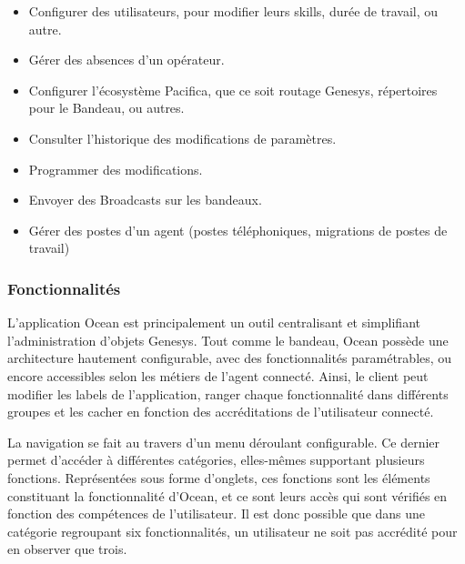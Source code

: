 \documentclass{rapport}
\begin{document}
\begin{itemize}
\item Configurer des utilisateurs, pour modifier leurs skills, durée de travail, ou autre.
\item Gérer des absences d'un opérateur.
\item Configurer l'écosystème Pacifica, que ce soit routage Genesys, répertoires pour le Bandeau, ou autres.
\item Consulter l'historique des modifications de paramètres.
\item Programmer des modifications.
\item Envoyer des Broadcasts sur les bandeaux.
\item Gérer des postes d'un agent (postes téléphoniques, migrations de postes de travail)
\end{itemize}

\subsubsection{Fonctionnalités}

L'application Ocean est principalement un outil centralisant et simplifiant l'administration d'objets Genesys. Tout comme le bandeau, Ocean possède une architecture hautement configurable, avec des fonctionnalités paramétrables, ou encore accessibles selon les métiers de l’agent connecté. Ainsi, le client peut modifier les labels de l'application, ranger chaque fonctionnalité dans différents groupes et les cacher en fonction des accréditations de l'utilisateur connecté.


\begin{minipage}{0.55\textwidth}

La navigation se fait au travers d'un menu déroulant configurable. Ce dernier permet d'accéder à différentes catégories, elles-mêmes supportant plusieurs fonctions. Représentées sous forme d'onglets, ces fonctions sont les éléments constituant la fonctionnalité d'Ocean, et ce sont leurs accès qui sont vérifiés en fonction des compétences de l'utilisateur. Il est donc possible que dans une catégorie regroupant six fonctionnalités, un utilisateur ne soit pas accrédité pour en observer que trois.

\end{minipage}
\begin{minipage}{0.45\textwidth}
\end{minipage}
\vspace{5mm} %
\noindent
\\
\end{document}
